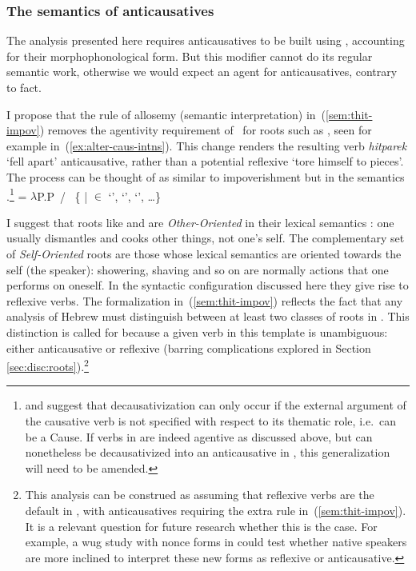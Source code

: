	\subsubsection{The semantics of anticausatives} \label{sec:refl:anticaus}
The analysis presented here requires {\thit} anticausatives to be built using {\va}, accounting for their morphophonological form. But this modifier cannot do its regular semantic work, otherwise we would expect an agent for anticausatives, contrary to fact.

I propose that the rule of allosemy (semantic interpretation) in~(\ref{sem:thit-impov}) removes the agentivity requirement of {\va}~for roots such as , seen for example in~(\ref{ex:alter-caus-intns}). This change renders the resulting verb \emph{hitparek} `fell apart' anticausative, rather than a potential reflexive `tore himself to pieces'. The process can be thought of as similar to impoverishment \citep{bonet91,noyer98} but in the semantics \citep{nevins15roots}.\footnote{\cite{unaccusativity95} and \cite{reinhart02} suggest that decausativization can only occur if the external argument of the causative verb is not specified with respect to its thematic role, i.e.~can be a Cause. If verbs in {\tpie} are indeed agentive as discussed above, but can nonetheless be decausativized into an anticausative in {\thit}, this generalization will need to be amended.}
\ex\label{sem:thit-impov}\denote{\va~\!} = $\lambda$P.P~/ {\vz} \trace~\{ | 
	  $\in$  `',  `',  `', \dots\}
\xe

I suggest that roots like  and  are \emph{Other-Oriented} in their lexical semantics \citep{schaefer12,alexiadouafto,spathasetal15}: one usually dismantles and cooks other things, not one's self. The complementary set of \emph{Self-Oriented} roots are those whose lexical semantics are oriented towards the self (the speaker): showering, shaving and so on are normally actions that one performs on oneself. In the syntactic configuration discussed here they give rise to reflexive verbs. The formalization in~(\ref{sem:thit-impov}) reflects the fact that any analysis of Hebrew must distinguish between at least two classes of roots in {\thit}. This distinction is called for because a given verb in this template is unambiguous: either anticausative or reflexive (barring complications explored in Section \ref{sec:disc:roots}).\footnote{This analysis can be construed as assuming that reflexive verbs are the default in {\thit}, with anticausatives requiring the extra rule in~(\ref{sem:thit-impov}). It is a relevant question for future research whether this is the case. For example, a wug study with nonce forms in {\thit} could test whether native speakers are more inclined to interpret these new forms as reflexive or anticausative.}


